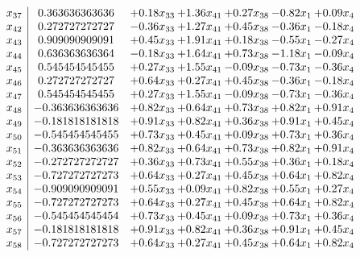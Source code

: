 \documentclass[8pt]{article}
\begin{document}
\[\begin{array}{c| c c@{\hskip 2pt} c@{\hskip 2pt} c@{\hskip 2pt} c@{\hskip 2pt} c@{\hskip 2pt} }
 x_{37}   &  0.363636363636 & +  0.18 x_{33} & +  1.36 x_{41} & +  0.27 x_{38} & -0.82 x_{1} & +  0.09 x_{4}\\
 x_{42}   &  0.272727272727 & -0.36 x_{33} & +  1.27 x_{41} & +  0.45 x_{38} & -0.36 x_{1} & -0.18 x_{4}\\
 x_{43}   &  0.909090909091 & +  0.45 x_{33} & +  1.91 x_{41} & +  0.18 x_{38} & -0.55 x_{1} & -0.27 x_{4}\\
 x_{44}   &  0.636363636364 & -0.18 x_{33} & +  1.64 x_{41} & +  0.73 x_{38} & -1.18 x_{1} & -0.09 x_{4}\\
 x_{45}   &  0.545454545455 & +  0.27 x_{33} & +  1.55 x_{41} & -0.09 x_{38} & -0.73 x_{1} & -0.36 x_{4}\\
 x_{46}   &  0.272727272727 & +  0.64 x_{33} & +  0.27 x_{41} & +  0.45 x_{38} & -0.36 x_{1} & -0.18 x_{4}\\
 x_{47}   &  0.545454545455 & +  0.27 x_{33} & +  1.55 x_{41} & -0.09 x_{38} & -0.73 x_{1} & -0.36 x_{4}\\
 x_{48}   &  -0.363636363636 & +  0.82 x_{33} & +  0.64 x_{41} & +  0.73 x_{38} & +  0.82 x_{1} & +  0.91 x_{4}\\
 x_{49}   &  -0.181818181818 & +  0.91 x_{33} & +  0.82 x_{41} & +  0.36 x_{38} & +  0.91 x_{1} & +  0.45 x_{4}\\
 x_{50}   &  -0.545454545455 & +  0.73 x_{33} & +  0.45 x_{41} & +  0.09 x_{38} & +  0.73 x_{1} & +  0.36 x_{4}\\
 x_{51}   &  -0.363636363636 & +  0.82 x_{33} & +  0.64 x_{41} & +  0.73 x_{38} & +  0.82 x_{1} & +  0.91 x_{4}\\
 x_{52}   &  -0.272727272727 & +  0.36 x_{33} & +  0.73 x_{41} & +  0.55 x_{38} & +  0.36 x_{1} & +  0.18 x_{4}\\
 x_{53}   &  -0.727272727273 & +  0.64 x_{33} & +  0.27 x_{41} & +  0.45 x_{38} & +  0.64 x_{1} & +  0.82 x_{4}\\
 x_{54}   &  -0.909090909091 & +  0.55 x_{33} & +  0.09 x_{41} & +  0.82 x_{38} & +  0.55 x_{1} & +  0.27 x_{4}\\
 x_{55}   &  -0.727272727273 & +  0.64 x_{33} & +  0.27 x_{41} & +  0.45 x_{38} & +  0.64 x_{1} & +  0.82 x_{4}\\
 x_{56}   &  -0.545454545454 & +  0.73 x_{33} & +  0.45 x_{41} & +  0.09 x_{38} & +  0.73 x_{1} & +  0.36 x_{4}\\
 x_{57}   &  -0.181818181818 & +  0.91 x_{33} & +  0.82 x_{41} & +  0.36 x_{38} & +  0.91 x_{1} & +  0.45 x_{4}\\
 x_{58}   &  -0.727272727273 & +  0.64 x_{33} & +  0.27 x_{41} & +  0.45 x_{38} & +  0.64 x_{1} & +  0.82 x_{4}\\

\end{array}\]
\end{document}
